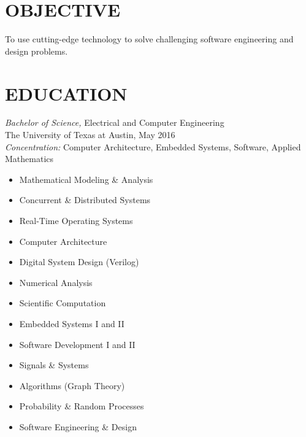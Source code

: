 \documentclass[margin]{res}
\begin{document}
\vspace{-3.5em}
\address{6109 Shadow Valley Dr Unit A\\
  Austin, TX 78731}
\address{\href{mailto:hershal.bhave@gmail.com}{\ul{\texttt{hershal.bhave@gmail.com}}} \\
  \href{https://github.com/hershal}{\ul{\texttt{github.com/hershal}}}}
\begin{resume}
  \section{OBJECTIVE}
  To use cutting-edge technology to solve challenging software engineering and
  design problems.
  \section{EDUCATION}
  {\sl Bachelor of Science,} Electrical and Computer Engineering \\
  The University of Texas at Austin, May 2016 \\
  {\sl Concentration:} Computer Architecture, Embedded Systems, Software,
  Applied Mathematics

  \vspace{-.5em}
  \begin{multicols}{2}
    \begin{itemize}
    \item Mathematical Modeling \& Analysis
    \item Concurrent \& Distributed Systems
    \item Real-Time Operating Systems
    \item Computer Architecture
    \item Digital System Design (Verilog)
    \item Numerical Analysis
    \item Scientific Computation
    \item Embedded Systems I and II
    \item Software Development I and II
    \item Signals \& Systems
    \item Algorithms (Graph Theory)
    \item Probability \& Random Processes
    \item Software Engineering \& Design
    \end{itemize}
  \end{multicols}


\end{resume}
\end{document}
